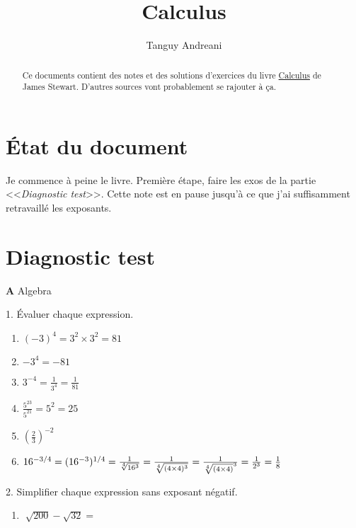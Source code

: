 \documentclass[fleqn,a4paper,nobib]{tufte-handout}
\title{Calculus}
\author{Tanguy Andreani}
\begin{document}
\maketitle

\begin{abstract}
    Ce documents contient des notes et des solutions d'exercices
    du livre \underline{Calculus} de James Stewart.
    D'autres sources vont probablement se rajouter à ça.
\end{abstract}

\tableofcontents

\section*{État du document}

Je commence à peine le livre. Première étape, faire les exos
de la partie <<\emph{Diagnostic test}>>. Cette note est en pause
jusqu'à ce que j'ai suffisamment retravaillé les exposants.

\section{Diagnostic test}

\textbf{A} Algebra

1. Évaluer chaque expression.

\begin{enumerate}[label=(\alph{*}),leftmargin=2cm,align=left]
    \item $(-3)^4 = 3^2 \times 3^2 = 81$
    \item $-3^4 = -81$
    \item \(3^{-4} = \frac{1}{3^4} = \frac{1}{81}\)
    \item \(\frac{5^{23}}{5^{21}} = 5^2 = 25\)
    \item $(\frac{2}{3})^{-2}$
    \item \(16^{-3/4} = (16^{-3})^{1/4} = \frac{1}{\sqrt[4]{16^3}}
    = \frac{1}{\sqrt[4]{(4\times4)^3}} = \frac{1}{\sqrt[4]{(4\times4)}^3}
    \linebreak = \frac{1}{2^3} = \frac{1}{8} \)
\end{enumerate}

2. Simplifier chaque expression sans exposant négatif.

\begin{enumerate}[label=(\alph{*}),leftmargin=2cm,align=left]
    \item $\sqrt[]{200} - \sqrt{32} = $
\end{enumerate}
\end{document}
